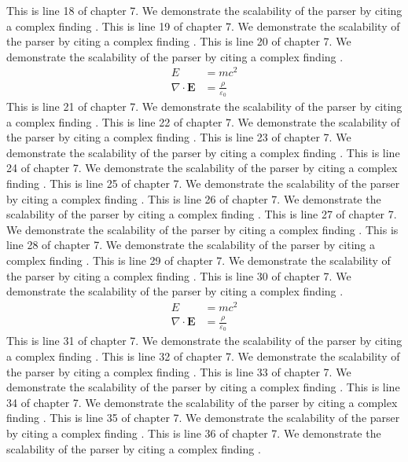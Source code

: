 This is line 18 of chapter 7. We demonstrate the scalability of the parser by citing a complex finding \cite{ref7_18}.
This is line 19 of chapter 7. We demonstrate the scalability of the parser by citing a complex finding \cite{ref7_19}.
This is line 20 of chapter 7. We demonstrate the scalability of the parser by citing a complex finding \cite{ref7_20}.
\begin{align*}
  E &= mc^2 \\
  \nabla \cdot \mathbf{E} &= \frac{\rho}{\varepsilon_0}
\end{align*}
This is line 21 of chapter 7. We demonstrate the scalability of the parser by citing a complex finding \cite{ref7_21}.
This is line 22 of chapter 7. We demonstrate the scalability of the parser by citing a complex finding \cite{ref7_22}.
This is line 23 of chapter 7. We demonstrate the scalability of the parser by citing a complex finding \cite{ref7_23}.
This is line 24 of chapter 7. We demonstrate the scalability of the parser by citing a complex finding \cite{ref7_24}.
This is line 25 of chapter 7. We demonstrate the scalability of the parser by citing a complex finding \cite{ref7_25}.
This is line 26 of chapter 7. We demonstrate the scalability of the parser by citing a complex finding \cite{ref7_26}.
This is line 27 of chapter 7. We demonstrate the scalability of the parser by citing a complex finding \cite{ref7_27}.
This is line 28 of chapter 7. We demonstrate the scalability of the parser by citing a complex finding \cite{ref7_28}.
This is line 29 of chapter 7. We demonstrate the scalability of the parser by citing a complex finding \cite{ref7_29}.
This is line 30 of chapter 7. We demonstrate the scalability of the parser by citing a complex finding \cite{ref7_30}.
\begin{align*}
  E &= mc^2 \\
  \nabla \cdot \mathbf{E} &= \frac{\rho}{\varepsilon_0}
\end{align*}
This is line 31 of chapter 7. We demonstrate the scalability of the parser by citing a complex finding \cite{ref7_31}.
This is line 32 of chapter 7. We demonstrate the scalability of the parser by citing a complex finding \cite{ref7_32}.
This is line 33 of chapter 7. We demonstrate the scalability of the parser by citing a complex finding \cite{ref7_33}.
This is line 34 of chapter 7. We demonstrate the scalability of the parser by citing a complex finding \cite{ref7_34}.
This is line 35 of chapter 7. We demonstrate the scalability of the parser by citing a complex finding \cite{ref7_35}.
This is line 36 of chapter 7. We demonstrate the scalability of the parser by citing a complex finding \cite{ref7_36}.
